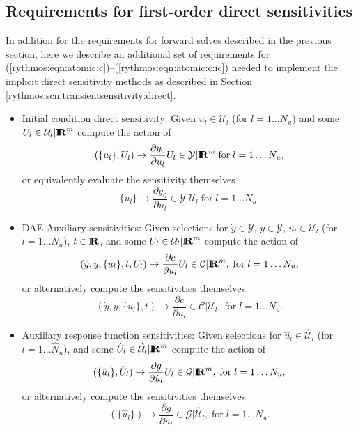 \documentclass[pdf,ps2pdf,11pt]{SANDreport}
\begin{document}
\subsection{Requirements for first-order direct sensitivities}

In addition for the requirements for forward solves described in the previous
section, here we describe an additional set of requirements for
(\ref{rythmos:eqn:atomic:c})--(\ref{rythmos:eqn:atomic:c:ic}) needed to
implement the implicit direct sensitivity methods as described in Section \ref{rythmos:scn:transientsensitivity:direct}.

\begin{itemize}

{}\item Initial condition direct sensitivity: Given $u_l\in\mathcal{U}_l$ (for
$l=1\ldots{}N_u$) and some $U_l\in\mathcal{U}_l|\mbox{\textbf{I}}\hspace{-0.6ex}\mbox{\textbf{R}}^m$ compute the action of
\[
(\{u_l\},U_l) {}\rightarrow \frac{\partial y_0}{\partial u_l} U_l \in \mathcal{Y}|\mbox{\textbf{I}}\hspace{-0.6ex}\mbox{\textbf{R}}^m
\; \mbox{for} \; l = 1 {}\ldots N_u,
\]
or equivalently evaluate the sensitivity themselves
\[
\{u_l\} {}\rightarrow \frac{\partial y_0}{\partial u_l} \in \mathcal{Y}|\mathcal{U}_l
\; \mbox{for} \; l = 1 {}\ldots N_u.
\]

{}\item DAE Auxiliary sensitivities: Given selections for
$\dot{y}\in\mathcal{Y}$, $y\in\mathcal{Y}$, $u_l\in\mathcal{U}_l$ (for
$l=1\ldots{}N_u$), $t\in\mbox{\textbf{I}}\hspace{-0.6ex}\mbox{\textbf{R}}$, and some $U_l\in\mathcal{U}_l|\mbox{\textbf{I}}\hspace{-0.6ex}\mbox{\textbf{R}}^m$ compute
the action of
\[
(\dot{y},y,\{u_l\},t,U_l) {}\rightarrow \frac{\partial c}{\partial u_l} U_l \in \mathcal{C}|\mbox{\textbf{I}}\hspace{-0.6ex}\mbox{\textbf{R}}^m,
\; \mbox{for} \; l = 1 {}\ldots N_u,
\]
or alternatively compute the sensitivities themselves
\[
(\dot{y},y,\{u_l\},t) {}\rightarrow \frac{\partial c}{\partial u_l} \in \mathcal{C}|\mathcal{U}_l,
\; \mbox{for} \; l = 1 {}\ldots N_u.
\]

{}\item Auxiliary response function sensitivities: Given selections for
$\hat{u}_l\in\hat{\mathcal{U}}_l$ (for $l=1\ldots{}\hat{N}_u$), and some
$\hat{U}_l\in\hat{\mathcal{U}}_l|\mbox{\textbf{I}}\hspace{-0.6ex}\mbox{\textbf{R}}^m$ compute the action of
\[
(\{\hat{u}_l\},\hat{U}_l) {}\rightarrow \frac{\partial g}{\partial \hat{u}_l} U_l \in \mathcal{G}|\mbox{\textbf{I}}\hspace{-0.6ex}\mbox{\textbf{R}}^m,
\; \mbox{for} \; l = 1 {}\ldots N_u,
\]
or alternatively compute the sensitivities themselves
\[
(\{\hat{u}_l\}) {}\rightarrow \frac{\partial g}{\partial u_l} \in \mathcal{G}|\hat{\mathcal{U}}_l,
\; \mbox{for} \; l = 1 {}\ldots N_u.
\]

\end{itemize}
\end{document}
